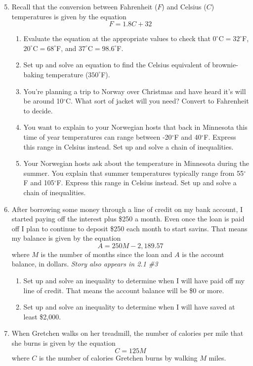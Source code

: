 \begin{enumerate} 
\setcounter{enumi}{4}

\item  Recall that the conversion between Fahrenheit ($F$) and Celsius ($C$) temperatures is given by the equation $$F = 1.8C+32$$
\begin{enumerate}
\item Evaluate the equation at the appropriate values to check that $0^\circ$C$=32^\circ$F, $20^\circ$C$=68^\circ$F, and $37^\circ$C$=98.6^\circ$F.
\item Set up and solve an equation to find the Celsius equivalent of brownie-baking temperature ($350^\circ$F).
\item You're planning a trip to Norway over Christmas and have heard it's will be around 10$^\circ$C.  What sort of jacket will you need?  Convert to Fahrenheit to decide. 
\item You want to explain to your Norwegian hosts that back in Minnesota this time of year temperatures can range between -20$^\circ$F and 40$^\circ$F.  Express this range in Celsius instead.  Set up and solve a chain of inequalities.
\item Your Norwegian hosts ask about the temperature in Minnesota during the summer.  You explain that summer temperatures typically range from 55$^\circ$F and 105$^\circ$F.  Express this range in Celsius instead.   Set up and solve a chain of inequalities.
\end{enumerate}

\item After borrowing some money through a line of credit on my bank account, I started paying off the interest plus \$250 a month.  Even once the loan is paid off I plan to continue to deposit \$250 each month to start savins.  That means my balance is given by the equation
$$A = 250M- 2,189.57$$
where $M$ is the number of months since the loan and $A$ is the account balance, in dollars. \hfill \emph{Story also appears in 2.1 \#3}
\begin{enumerate}
\item Set up and solve an inequality to determine when I will have paid off my line of credit. That means the account balance will be \$0 or more.
\item Set up and solve an inequality to determine when I will have saved at least \$2,000.
\end{enumerate}  

\item When Gretchen walks on her treadmill, the number of calories per mile that she burns is given by the equation $$C=125M$$ where $C$ is the number of calories Gretchen burns by walking $M$ miles.  


\end{enumerate}
